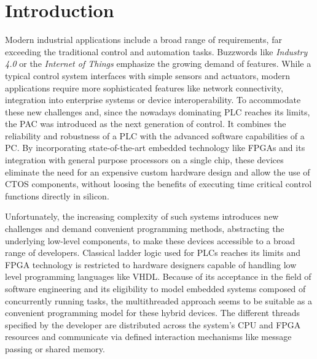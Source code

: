 \chapter{Introduction}

Modern industrial applications include a broad range of requirements, far
exceeding the traditional control and automation tasks. Buzzwords like
\emph{Industry 4.0} or the \emph{Internet of Things} emphasize the growing
demand of features. While a typical control system interfaces with simple
sensors and actuators, modern applications require more sophisticated features
like network connectivity, integration into enterprise systems or device
interoperability. To accommodate these new challenges and, since the nowadays
dominating \ac{PLC} reaches its limits, the \ac{PAC} was introduced as the
next generation of control. It combines the reliability and robustness of a
\ac{PLC} with the advanced software capabilities of a \ac{PC}. By
incorporating state-of-the-art embedded technology like \acp{FPGA} and its
integration with general purpose processors on a single chip, these devices
eliminate the need for an expensive custom hardware design and allow  the use
of \ac{CTOS} components, without loosing the benefits of executing time
critical control functions directly in silicon.

Unfortunately, the increasing complexity of such systems introduces new
challenges and demand convenient programming methods, abstracting the
underlying low-level components, to make these devices accessible to a broad
range of developers. Classical ladder logic used for \acp{PLC} reaches its
limits and \ac{FPGA} technology is restricted to hardware designers capable of
handling low level programming languages like \ac{VHDL}. Because of its
acceptance in the field of software engineering and its eligibility to model
embedded systems composed of concurrently running tasks, the multithreaded
approach seems to be suitable as a convenient programming model for these
hybrid devices. The different threads specified by the developer are
distributed across the system's \ac{CPU} and \ac{FPGA} resources and
communicate via defined interaction mechanisms like message passing or shared
memory.

